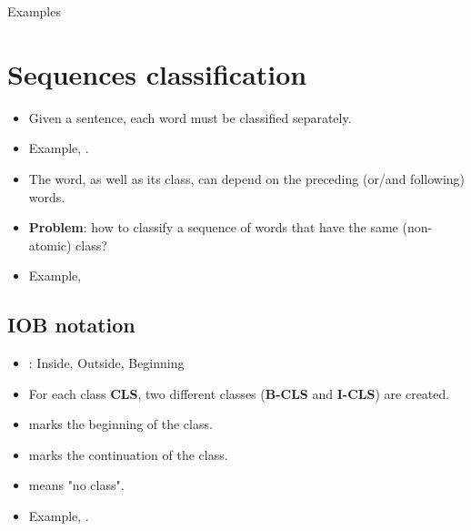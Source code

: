 \documentclass{KBook}
\begin{document}
Examples
	
	


\section{Sequences classification}


	\begin{itemize}
		\item Given a sentence, each word must be classified separately.
		\item Example, .
		\item The word, as well as its class, can depend on the preceding (or/and following) words.
		\item \textbf{Problem}: how to classify a sequence of words that have the same (non-atomic) class?
		\item Example, 
	\end{itemize}
	


\subsection{IOB notation}


	
	\begin{itemize}
		\item {}: Inside, Outside, Beginning
		\item For each class \textbf{CLS}, two different classes (\textbf{B-CLS} and \textbf{I-CLS}) are created.
		\item {} marks the beginning of the class.
		\item {} marks the continuation of the class.
		\item {} means "no class".
		\item Example, .
	\end{itemize}
\end{document}
